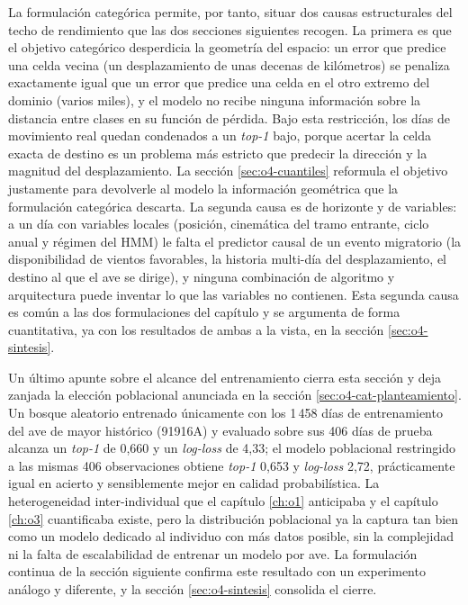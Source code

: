 La formulación categórica permite, por tanto, situar dos causas estructurales del
techo de rendimiento que las dos secciones siguientes recogen. La primera es que el
objetivo categórico desperdicia la geometría del espacio: un error que predice una
celda vecina (un desplazamiento de unas decenas de kilómetros) se penaliza
exactamente igual que un error que predice una celda en el otro extremo del dominio
(varios miles), y el modelo no recibe ninguna información sobre la distancia entre
clases en su función de pérdida. Bajo esta restricción, los días de movimiento real
quedan condenados a un \textit{top-1} bajo, porque acertar la celda exacta de
destino es un problema más estricto que predecir la dirección y la magnitud del
desplazamiento. La sección \ref{sec:o4-cuantiles} reformula el objetivo justamente
para devolverle al modelo la información geométrica que la formulación categórica
descarta. La segunda causa es de horizonte y de variables: a un día con variables
locales (posición, cinemática del tramo entrante, ciclo anual y régimen del HMM) le
falta el predictor causal de un evento migratorio (la disponibilidad de vientos
favorables, la historia multi-día del desplazamiento, el destino al que el ave se
dirige), y ninguna combinación de algoritmo y arquitectura puede inventar lo que las
variables no contienen. Esta segunda causa es común a las dos formulaciones del
capítulo y se argumenta de forma cuantitativa, ya con los resultados de ambas a la
vista, en la sección \ref{sec:o4-sintesis}.

Un último apunte sobre el alcance del entrenamiento cierra esta sección y deja
zanjada la elección poblacional anunciada en la sección
\ref{sec:o4-cat-planteamiento}. Un bosque aleatorio entrenado únicamente con los
1\,458 días de entrenamiento del ave de mayor histórico (91916A) y evaluado sobre
sus 406 días de prueba alcanza un \textit{top-1} de 0,660 y un \textit{log-loss} de
4,33; el modelo poblacional restringido a las mismas 406 observaciones obtiene
\textit{top-1} 0,653 y \textit{log-loss} 2,72, prácticamente igual en acierto y
sensiblemente mejor en calidad probabilística. La heterogeneidad inter-individual
que el capítulo \ref{ch:o1} anticipaba y el capítulo \ref{ch:o3} cuantificaba existe,
pero la distribución poblacional ya la captura tan bien como un modelo dedicado al
individuo con más datos posible, sin la complejidad ni la falta de escalabilidad de
entrenar un modelo por ave. La formulación continua de la sección siguiente confirma
este resultado con un experimento análogo y diferente, y la sección
\ref{sec:o4-sintesis} consolida el cierre.

